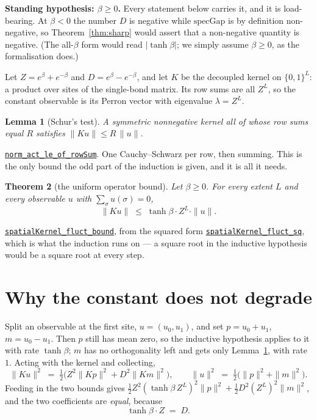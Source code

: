 \documentclass[11pt]{article}
\newtheorem{theorem}{Theorem}[section]
\newtheorem{lemma}[theorem]{Lemma}
\theoremstyle{definition}
\newcommand{\anchor}{247de2b31c8b2b6edb2cffe5fd6d96d6aa5c8a7a}
\newcommand{\osline}[3]{%
  \href{https://github.com/lluiseriksson/THE-ERIKSSON-PROGRAMME/blob/\anchor/YangMills/OS/#1.lean\#L#2}{\nolinkurl{#3}}}
\begin{document}
\textbf{Standing hypothesis: $\beta\ge0$.}  Every statement below carries it,
and it is load-bearing.  At $\beta<0$ the number $D$ is negative while
$\mathrm{specGap}$ is by definition non-negative, so Theorem~\ref{thm:sharp}
would assert that a non-negative quantity is negative.  (The all-$\beta$ form
would read $|\tanh\beta|$; we simply assume $\beta\ge0$, as the formalisation
does.)

Let $Z = e^{\beta}+e^{-\beta}$ and $D = e^{\beta}-e^{-\beta}$, and let $K$ be the
decoupled kernel on $\{0,1\}^L$: a product over sites of the single-bond matrix.
Its row sums are all $Z^L$, so the constant observable is its Perron vector with
eigenvalue $\lambda = Z^L$.

\begin{lemma}[Schur's test]\label{lem:schur}
A symmetric nonnegative kernel all of whose row sums equal $R$ satisfies
$\|Ku\| \le R\,\|u\|$.
\end{lemma}

\osline{SpatialUniform}{115}{norm\_act\_le\_of\_rowSum}.
One Cauchy--Schwarz per row, then summing.  This is the only bound the odd part
of the induction is given, and it is all it needs.

\begin{theorem}[the uniform operator bound]\label{thm:uniform}
Let $\beta\ge0$.  For every extent $L$ and every observable $u$ with
$\sum_\sigma u(\sigma)=0$,
\[
  \|Ku\| \;\le\; \tanh\beta \cdot Z^{L} \cdot \|u\| .
\]
\end{theorem}

\osline{SpatialUniform}{350}{spatialKernel\_fluct\_bound}, from the squared
form \osline{SpatialUniform}{208}{spatialKernel\_fluct\_sq}, which is what the
induction runs on --- a square root in the inductive hypothesis would be a
square root at every step.

\section{Why the constant does not degrade}\label{sec:exact}

Split an observable at the first site, $u = (u_0,u_1)$, and set $p = u_0+u_1$,
$m = u_0-u_1$.  Then $p$ still has mean zero, so the inductive hypothesis
applies to it with rate $\tanh\beta$; $m$ has no orthogonality left and gets
only Lemma~\ref{lem:schur}, with rate $1$.  Acting with the kernel and
collecting,
\[
  \|Ku\|^{2} \;=\; \tfrac12\bigl(Z^{2}\|Kp\|^{2} + D^{2}\|Km\|^{2}\bigr),
  \qquad
  \|u\|^{2} \;=\; \tfrac12\bigl(\|p\|^{2}+\|m\|^{2}\bigr).
\]
Feeding in the two bounds gives
$\tfrac12 Z^{2}(\tanh\beta\,Z^{L})^{2}\|p\|^{2}
 + \tfrac12 D^{2}(Z^{L})^{2}\|m\|^{2}$, and the two coefficients are
\emph{equal}, because
\[
  \tanh\beta \cdot Z \;=\; D .
\]
\end{document}
